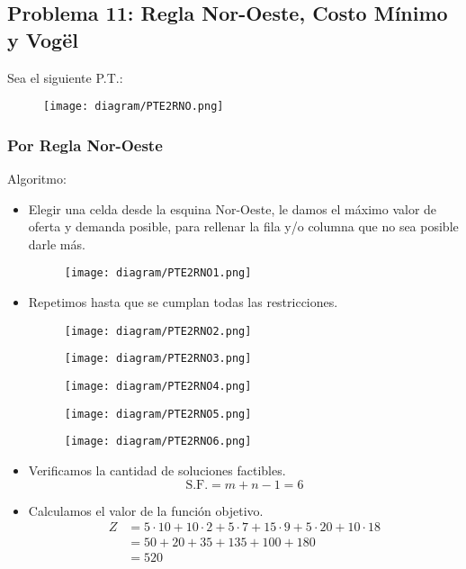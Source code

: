 \documentclass{templateNote}
\begin{document}
\subsection*{Problema 11: Regla Nor-Oeste, Costo Mínimo y Vogël}
Sea el siguiente P.T.:
\begin{figure}[H]
    \centering
    \texttt{[image: diagram/PTE2RNO.png]}
\end{figure}

\newpage
\subsubsection*{Por Regla Nor-Oeste}

Algoritmo:
\begin{itemize}
    \item Elegir una celda desde la esquina Nor-Oeste, le damos el máximo valor de oferta y demanda posible, para rellenar la fila y/o columna que no sea posible darle más.
    \begin{figure}[H]
        \centering
        \texttt{[image: diagram/PTE2RNO1.png]}
    \end{figure}

    \item Repetimos hasta que se cumplan todas las restricciones.
    \begin{figure}[H]
        \centering
        \texttt{[image: diagram/PTE2RNO2.png]}
    \end{figure}

    \begin{figure}[H]
        \centering
        \texttt{[image: diagram/PTE2RNO3.png]}
    \end{figure}

    \begin{figure}[H]
        \centering
        \texttt{[image: diagram/PTE2RNO4.png]}
    \end{figure}

    \begin{figure}[H]
        \centering
        \texttt{[image: diagram/PTE2RNO5.png]}
    \end{figure}

    \begin{figure}[H]
        \centering
        \texttt{[image: diagram/PTE2RNO6.png]}
    \end{figure}

    \item Verificamos la cantidad de soluciones factibles.
    \begin{equation*}
        \text{S.F.} = m+n-1 = 6
    \end{equation*}

    \item Calculamos el valor de la función objetivo.
    \begin{align*}
        Z &= 5 \cdot 10 + 10 \cdot 2 + 5 \cdot 7 + 15 \cdot 9 + 5 \cdot 20 + 10 \cdot 18 \\
        &= 50 + 20 + 35 + 135 + 100 + 180 \\
        &= 520 
    \end{align*}
\end{itemize}
\end{document}
